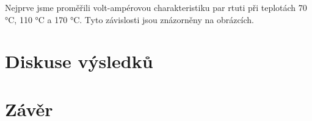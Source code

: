 Nejprve jsme proměřili volt-ampérovou charakteristiku par rtuti při teplotách 70 °C, 110 °C a 170 °C. Tyto závislosti jsou znázorněny na obrázcích.




    
\section{Diskuse výsledků}

\section{Závěr}
